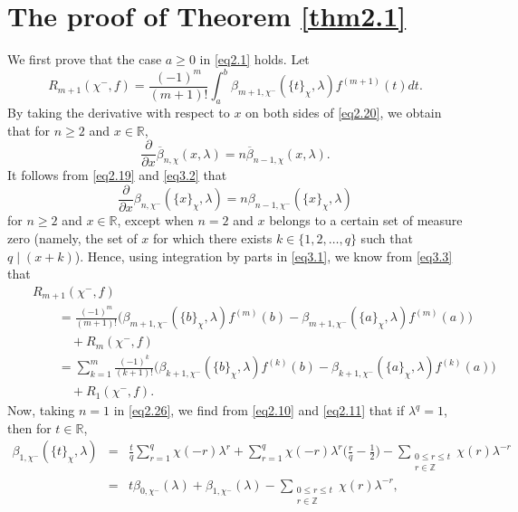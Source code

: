 \documentclass[reqno]{amsart}
\numberwithin{equation}{section}
\begin{document}
\section{The proof of Theorem \ref{thm2.1}}\label{sec3}

We first prove that the case $a\geq0$ in \eqref{eq2.1} holds. Let
\begin{equation}\label{eq3.1}
R_{m+1}(\chi^{-},f)=\frac{(-1)^{m}}{(m+1)!}\int_{a}^{b}\beta_{m+1,\chi^{-}}(\{t\}_{\chi},\lambda)f^{(m+1)}(t)dt.
\end{equation}
By taking the derivative with respect to $x$ on both sides of \eqref{eq2.20}, we obtain that for $n\geqslant2$ and $x\in\mathbb{R}$,
\begin{equation}\label{eq3.2}
\frac{\partial}{\partial x}\overline{\beta}_{n,\chi}(x,\lambda)=n\overline{\beta}_{n-1,\chi}(x,\lambda).
\end{equation}
It follows from \eqref{eq2.19} and \eqref{eq3.2} that
\begin{equation}\label{eq3.3}
\frac{\partial}{\partial x}\beta_{n,\chi^{-}}(\{x\}_{\chi},\lambda)=n\beta_{n-1,\chi^{-}}(\{x\}_{\chi},\lambda)
\end{equation}
for $n\geqslant2$ and $x\in\mathbb{R}$, except when $n=2$ and $x$ belongs to a certain set of measure zero (namely, the set of $x$ for which there exists $k\in\{1,2,\ldots,q\}$ such that $q\mid(x+k)$). Hence, using integration by parts in \eqref{eq3.1}, we know from \eqref{eq3.3} that
\begin{eqnarray}\label{eq3.4}
&&R_{m+1}(\chi^{-},f)\nonumber\\
&&\qquad=\frac{(-1)^{m}}{(m+1)!}\bigl(\beta_{m+1,\chi^{-}}(\{b\}_{\chi},\lambda)f^{(m)}(b)-\beta_{m+1,\chi^{-}}(\{a\}_{\chi},\lambda)f^{(m)}(a)\bigl)\nonumber\\
&&\qquad\quad+R_{m}(\chi^{-},f)\nonumber\\
&&\qquad=\sum_{k=1}^{m}\frac{(-1)^{k}}{(k+1)!}\bigl(\beta_{k+1,\chi^{-}}(\{b\}_{\chi},\lambda)f^{(k)}(b)-\beta_{k+1,\chi^{-}}(\{a\}_{\chi},\lambda)f^{(k)}(a)\bigl)\nonumber\\
&&\qquad\quad+R_{1}(\chi^{-},f).
\end{eqnarray}
Now, taking $n=1$ in \eqref{eq2.26}, we find from \eqref{eq2.10} and \eqref{eq2.11} that if $\lambda^{q}=1$, then for $t\in\mathbb{R}$,
\begin{eqnarray}\label{eq3.5}
\beta_{1,\chi^{-}}(\{t\}_{\chi},\lambda)&=&\frac{t}{q}\sum_{r=1}^{q}\chi(-r)\lambda^{r}+\sum_{r=1}^{q}\chi(-r)\lambda^{r}\biggl(\frac{r}{q}-\frac{1}{2}\biggl)-\underset{\substack{0\leqslant r\leqslant t\\ r\in\mathbb{Z}}}{\sum}\chi(r)\lambda^{-r}\nonumber\\
&=&t\beta_{0,\chi^{-}}(\lambda)+\beta_{1,\chi^{-}}(\lambda)-\underset{\substack{0\leqslant r\leqslant t\\ r\in\mathbb{Z}}}{\sum}\chi(r)\lambda^{-r},
\end{eqnarray}
\end{document}
